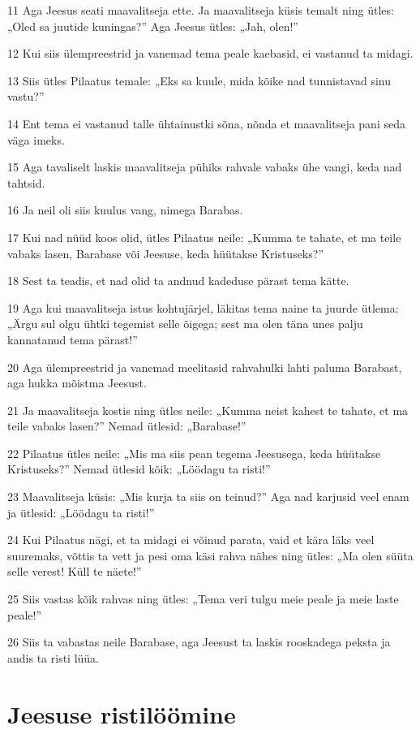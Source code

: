 \par 11 Aga Jeesus seati maavalitseja ette. Ja maavalitseja küsis temalt ning ütles: „Oled sa juutide kuningas?” Aga Jeesus ütles: „Jah, olen!”
\par 12 Kui siis ülempreestrid ja vanemad tema peale kaebasid, ei vastanud ta midagi.
\par 13 Siis ütles Pilaatus temale: „Eks sa kuule, mida kõike nad tunnistavad sinu vastu?”
\par 14 Ent tema ei vastanud talle ühtainustki sõna, nõnda et maavalitseja pani seda väga imeks.
\par 15 Aga tavaliselt laskis maavalitseja pühiks rahvale vabaks ühe vangi, keda nad tahtsid.
\par 16 Ja neil oli siis kuulus vang, nimega Barabas.
\par 17 Kui nad nüüd koos olid, ütles Pilaatus neile: „Kumma te tahate, et ma teile vabaks lasen, Barabase või Jeesuse, keda hüütakse Kristuseks?”
\par 18 Sest ta teadis, et nad olid ta andnud kadeduse pärast tema kätte.
\par 19 Aga kui maavalitseja istus kohtujärjel, läkitas tema naine ta juurde ütlema: „Ärgu sul olgu ühtki tegemist selle õigega; sest ma olen täna unes palju kannatanud tema pärast!”
\par 20 Aga ülempreestrid ja vanemad meelitasid rahvahulki lahti paluma Barabast, aga hukka mõistma Jeesust.
\par 21 Ja maavalitseja kostis ning ütles neile: „Kumma neist kahest te tahate, et ma teile vabaks lasen?” Nemad ütlesid: „Barabase!”
\par 22 Pilaatus ütles neile: „Mis ma siis pean tegema Jeesusega, keda hüütakse Kristuseks?” Nemad ütlesid kõik: „Löödagu ta risti!”
\par 23 Maavalitseja küsis: „Mis kurja ta siis on teinud?” Aga nad karjusid veel enam ja ütlesid: „Löödagu ta risti!”
\par 24 Kui Pilaatus nägi, et ta midagi ei võinud parata, vaid et kära läks veel suuremaks, võttis ta vett ja pesi oma käsi rahva nähes ning ütles: „Ma olen süüta selle verest! Küll te näete!”
\par 25 Siis vastas kõik rahvas ning ütles: „Tema veri tulgu meie peale ja meie laste peale!”
\par 26 Siis ta vabastas neile Barabase, aga Jeesust ta laskis rooskadega peksta ja andis ta risti lüüa.

\section*{Jeesuse ristilöömine}


